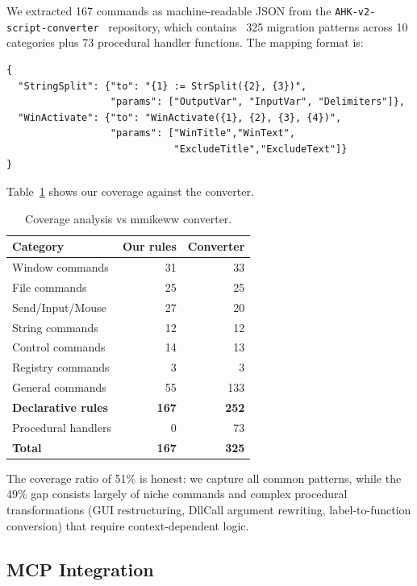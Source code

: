 \documentclass[11pt,a4paper]{article}
\begin{document}
\begin{enumerate}
We extracted 167 commands as machine-readable JSON from the \texttt{AHK-v2-script-converter}~\cite{converter} repository, which contains ~325 migration patterns across 10 categories plus 73 procedural handler functions. The mapping format is:

\begin{lstlisting}[style=ahk,frame=none,numbers=none]
{
  "StringSplit": {"to": "{1} := StrSplit({2}, {3})",
                  "params": ["OutputVar", "InputVar", "Delimiters"]},
  "WinActivate": {"to": "WinActivate({1}, {2}, {3}, {4})",
                  "params": ["WinTitle","WinText",
                             "ExcludeTitle","ExcludeText"]}
}
\end{lstlisting}

Table~\ref{tab:coverage} shows our coverage against the converter.

\begin{table}[h]
\centering\small
\caption{Coverage analysis vs mmikeww converter.}
\label{tab:coverage}
\begin{tabular}{lrr}
\toprule
\textbf{Category} & \textbf{Our rules} & \textbf{Converter} \\
\midrule
Window commands & 31 & ~33 \\
File commands & 25 & ~25 \\
Send/Input/Mouse & 27 & ~20 \\
String commands & 12 & ~12 \\
Control commands & 14 & ~13 \\
Registry commands & 3 & ~3 \\
General commands & 55 & ~133 \\
\midrule
\textbf{Declarative rules} & \textbf{167} & \textbf{252} \\
Procedural handlers & 0 & 73 \\
\midrule
\textbf{Total} & \textbf{167} & \textbf{325} \\
\bottomrule
\end{tabular}
\end{table}

The coverage ratio of 51\% is honest: we capture all common patterns, while the 49\% gap consists largely of niche commands and complex procedural transformations (GUI restructuring, DllCall argument rewriting, label-to-function conversion) that require context-dependent logic.

\subsection{MCP Integration}


\end{enumerate}
\end{document}
